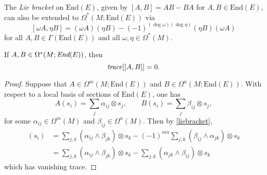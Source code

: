 \documentclass[a4paper,openany]{scrbook}
\begin{document}
The \emph{Lie bracket} on $\text{End}(E)$, given by $[A,B]=AB-BA$ for $A,B\in\text{End}(E)$, can also be extended to $\Omega^*(M;\text{End}(E))$ via
\begin{equation}\label{liebracket}
[\omega A,\eta B]=(\omega A)(\eta B)-(-1)^{(\deg\omega)(\deg\eta)}(\eta B)(\omega A)
\end{equation}
for all $A,B\in\Gamma(\text{End}(E))$ and all $\omega,\eta\in\Omega^*(M)$.

\begin{lemma}\label{tracelie}
If $A,B\in\Omega^*(M;\emph{End}(E))$, then
\begin{equation}
\emph{trace}[[A,B]]=0.
\end{equation}
\end{lemma}
\begin{proof}
Suppose that $A\in\Omega^m(M;\text{End}(E))$ and $B\in\Omega^n(M;\text{End}(E))$. With respect to a local basis of sections of $\text{End}(E)$, one has
\begin{equation*}
A(s_i)=\sum_j\alpha_{ij}\otimes s_j,\qquad B(s_i)=\sum_j\beta_{ij}\otimes s_j,
\end{equation*}
for some $\alpha_{ij}\in\Omega^m(M)$ and $\beta_{ij}\in\Omega^n(M)$. Then by \eqref{liebracket},
\begin{align*}
[A,B](s_i)&=\sum_{j,k}(\alpha_{ij}\wedge\beta_{jk})\otimes s_k-(-1)^{mn}\sum_{j,k}(\beta_{ij}\wedge\alpha_{jk})\otimes s_k\\
&=\sum_{j,k}(\alpha_{ij}\wedge\beta_{jk})\otimes s_k-\sum_{j,k}(\alpha_{jk}\wedge\beta_{ij})\otimes s_k
\end{align*}
which has vanishing trace.
\end{proof}
\end{document}
